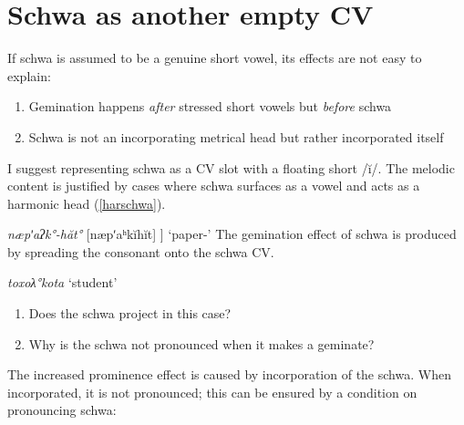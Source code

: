 \documentclass[a4paper, 12pt]{article}
\begin{document}
		\section{Schwa as another empty CV}
		
	If schwa is assumed to be a genuine short vowel, its effects are not easy to explain:
	
	\begin{enumerate}[$\gg$]
		\item Gemination happens \emph{after} stressed short vowels but \emph{before} schwa
		\item Schwa is not an incorporating metrical head but rather incorporated itself
	\end{enumerate}
	
	I suggest representing schwa as a CV slot with a floating short /ĭ/. The melodic content is justified by cases where schwa surfaces as a vowel and acts as a harmonic head (\ref{harschwa}).
	
	\ex\label{harschwa} \emph{næpʹaʔk°-hăt°} [næpʹaʰkĭhĭt] ] \hfill `paper-{\Abl}' \xe
	The gemination effect of schwa is produced by spreading the consonant onto the schwa CV. 
	
			\ex \emph{toxoλ°kota} `student' \\
			\xe
		
	\begin{enumerate}[$\gg$]
		\item Does the schwa project in this case?
		\item Why is the schwa not pronounced when it makes a geminate?
	\end{enumerate}
	
	The increased prominence effect is caused by incorporation of the schwa. When incorporated, it is not pronounced; this can be ensured by a condition on pronouncing schwa:
	
\end{document}

